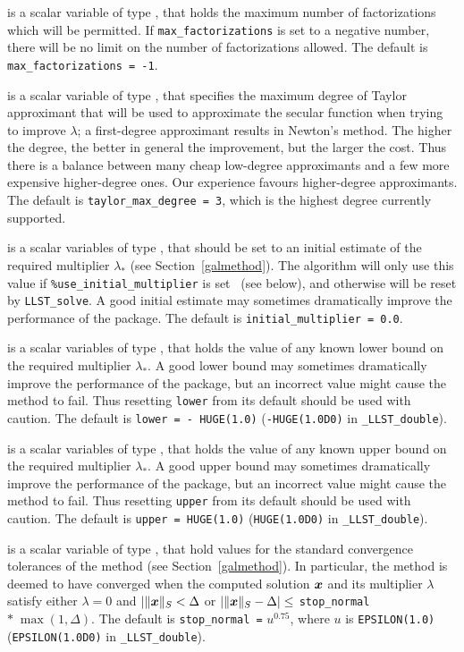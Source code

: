 \documentclass{galahad}
\newcommand{\packagename}{LLST}
\newcommand{\fullpackagename}{\libraryname\_\packagename}
\begin{document}
\begin{description}
 is a scalar variable of type \integer,
that holds the maximum number of factorizations which will be permitted.
If {\tt max\_factorizations} is set to a negative number, there will be
no limit on the number of factorizations allowed.
The default is {\tt max\_factorizations = -1}.

 is a scalar variable of type \integer,
that specifies the maximum degree of Taylor approximant that will be used
to approximate the secular function when trying to improve $\lambda$;
a first-degree approximant results in Newton's method.
The higher the degree, the better in general the improvement, but the larger the
cost. Thus there is a balance between many cheap low-degree approximants
and a few more expensive higher-degree ones. Our experience favours
higher-degree approximants.
The default is {\tt taylor\_max\_degree = 3}, which is the highest degree
currently supported.

 is a scalar variables of type \realdp, that should
be set to an initial estimate of the required multiplier $\lambda_*$
(see Section~\ref{galmethod}). The algorithm will only use this value
if {\tt \%use\_initial\_multiplier} is set \true\ (see below), and otherwise
will be reset by {\tt \packagename\_solve}. A good initial estimate
may sometimes dramatically improve the performance of the package.
The default is {\tt initial\_multiplier = 0.0}.

 is a scalar variables of type \realdp, that holds the value
of any known lower bound on the required multiplier $\lambda_*$. A good lower
bound may sometimes dramatically improve the performance of the package, but
an incorrect value might cause the method to fail. Thus resetting
{\tt lower} from its default should be used with caution.
The default is {\tt lower = - HUGE(1.0)}
({\tt -HUGE(1.0D0)} in {\tt \fullpackagename\_double}).

 is a scalar variables of type \realdp, that holds the value
of any known upper bound on the required multiplier $\lambda_*$. A good upper
bound may sometimes dramatically improve the performance of the package, but
an incorrect value might cause the method to fail. Thus resetting
{\tt upper} from its default should be used with caution.
The default is {\tt upper = HUGE(1.0)}
({\tt HUGE(1.0D0)} in {\tt \fullpackagename\_double}).

 is a scalar variable of type \realdp,
that hold values for the standard convergence tolerances of the method
(see Section~\ref{galmethod}).
In particular, the method is deemed to have converged when the
computed solution ${\bm{x}}$ and its multiplier $\lambda$ satisfy either
$\lambda = 0$ and $|\|{\bm{x}}\|_S < \Delta$ or
$|\|{\bm{x}}\|_S -  \Delta| \leq$ {\tt stop\_normal} $\ast \; \max(1,\Delta)$.
The default is {\tt stop\_normal =} $u^{0.75}$,
where $u$ is {\tt EPSILON(1.0)} ({\tt EPSILON(1.0D0)} in
{\tt \fullpackagename\_double}).


\end{description}
\end{document}
